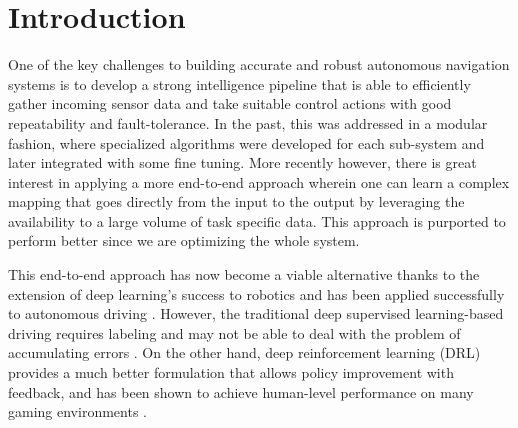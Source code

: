 \documentclass[../thesis.tex]{subfiles}
\begin{document}
\section{Introduction}


One of the key challenges to building accurate and robust autonomous navigation systems is to develop a strong intelligence pipeline that is able to efficiently gather incoming sensor data and take suitable control actions with good repeatability and fault-tolerance. In the past, this was addressed in a modular fashion, where  specialized algorithms were developed for each sub-system and later integrated with some fine tuning. More recently however, there is great interest in applying a more end-to-end approach wherein one can learn a complex mapping that goes directly from the input to the output by leveraging the availability to a large volume of task specific data. This approach is purported to perform better since we are optimizing the whole system. 


This end-to-end approach has now become a viable alternative thanks to the extension of deep learning's success to robotics and has been applied successfully to autonomous driving \cite{deepdriving,nvidiacar,endtoendcars}. 
However, the traditional deep supervised learning-based driving requires labeling and may not be able to deal with the problem of accumulating errors \cite{ross2011reduction}. On the other hand, deep reinforcement learning (DRL) provides a much better formulation that allows policy improvement with feedback, and has been shown to achieve human-level performance on many gaming environments \cite{mnih2013playing, mnih2015human,2016-TOG-deepRL}.
\end{document}
